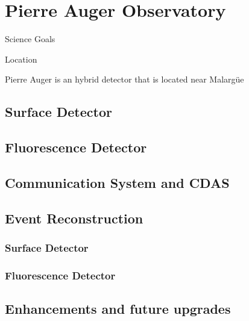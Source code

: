 \chapter{Pierre Auger Observatory}\label{Ch:PAO}


Science Goals

Location

Pierre Auger is an hybrid detector that is located near Malarg\"ue


\section{Surface Detector}

\section{Fluorescence Detector}

\section{Communication System and CDAS}

\section{Event Reconstruction}

\subsection{Surface Detector}

\subsection{Fluorescence Detector}

\section{Enhancements and future upgrades}